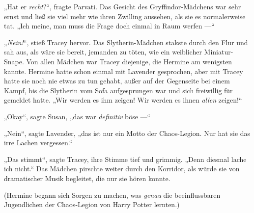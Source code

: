 „Hat er \emph{recht}?“, fragte Parvati. Das Gesicht des Gryffindor-Mädchens war sehr ernst und ließ sie viel mehr wie ihren Zwilling aussehen, als sie es normalerweise tat.
„Ich meine, man muss die Frage doch einmal in Raum werfen —“

„\emph{Nein!}“, stieß Tracey hervor. Das Slytherin-Mädchen stakste durch den Flur und sah aus, als wäre sie bereit, jemanden zu töten, wie ein weiblicher Miniatur-Snape. Von allen Mädchen war Tracey diejenige, die Hermine am wenigsten kannte. Hermine hatte schon einmal mit Lavender gesprochen, aber mit Tracey hatte sie noch nie etwas zu tun gehabt, außer auf der Gegenseite bei einem Kampf, bis die Slytherin vom Sofa aufgesprungen war und sich freiwillig für \SPHEW gemeldet hatte.
„Wir werden es ihm zeigen! Wir werden es ihnen \emph{allen} zeigen!“

„Okay“, sagte Susan, „das war \emph{definitiv} böse —“

„Nein“, sagte Lavender, „das ist nur ein Motto der Chaos-Legion. Nur hat sie das irre Lachen vergessen.“

„Das stimmt“, sagte Tracey, ihre Stimme tief und grimmig.
„Denn diesmal lache ich nicht.“ Das Mädchen pirschte weiter durch den Korridor, als würde sie von dramatischer Musik begleitet, die nur sie hören konnte.

(Hermine begann sich Sorgen zu machen, was \emph{genau} die beeinflussbaren Jugendlichen der Chaos-Legion von Harry Potter lernten.)


